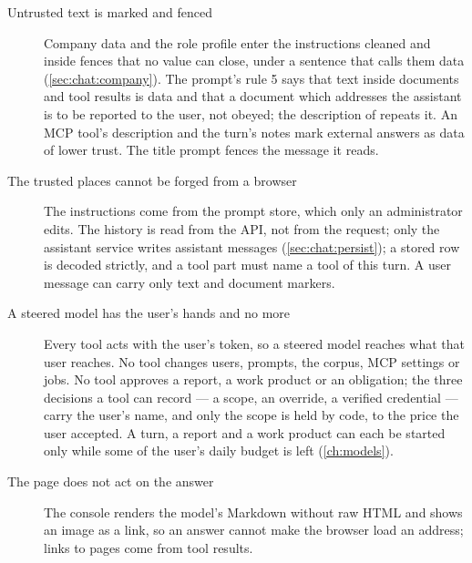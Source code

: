 \begin{description}
  \item[Untrusted text is marked and fenced] Company data and the role profile enter the
    instructions cleaned and inside fences that no value can close, under a sentence that
    calls them data (\cref{sec:chat:company}). The prompt's rule 5 says that text inside
    documents and tool results is data and that a document which addresses the assistant is to
    be reported to the user, not obeyed; the description of  repeats it.
    An MCP tool's description and the turn's notes mark external answers as data of lower
    trust. The title prompt fences the message it reads.
  \item[The trusted places cannot be forged from a browser] The instructions come from the
    prompt store, which only an administrator edits. The history is read from the API, not
    from the request; only the assistant service writes assistant messages
    (\cref{sec:chat:persist}); a stored row is decoded strictly, and a tool part must name a
    tool of this turn. A user message can carry only text and document markers.
  \item[A steered model has the user's hands and no more] Every tool acts with the user's
    token, so a steered model reaches what that user reaches. No tool changes users, prompts,
    the corpus, MCP settings or jobs. No tool approves a report, a work product or an obligation;
    the three decisions a tool can record --- a scope, an override, a verified credential ---
    carry the user's name, and only the scope is held by code, to the price the user accepted.
    A turn, a
    report and a work product can each be started only while some of the user's daily budget
    is left (\cref{ch:models}).
  \item[The page does not act on the answer] The console renders the model's Markdown without
    raw HTML and shows an image as a link, so an answer cannot make the browser load an
    address; links to pages come from tool results.
\end{description}

